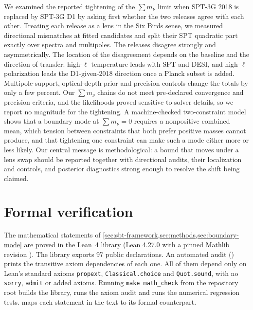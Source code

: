 \documentclass[11pt]{article}
\theoremstyle{remark}
\newcommand{\mnu}{\sum m_\nu}
\numberwithin{equation}{section}
\begin{document}
We examined the reported tightening of the $\mnu$ limit when SPT-3G 2018 is replaced by SPT-3G D1 by asking first whether the two releases agree with each other. Treating each release as a lens in the Six Birds sense, we measured directional mismatches at fitted candidates and split their SPT quadratic part exactly over spectra and multipoles. The releases disagree strongly and asymmetrically. The location of the disagreement depends on the baseline and the direction of transfer: high-$\ell$ temperature leads with SPT and DESI, and high-$\ell$ polarization leads the D1-given-2018 direction once a Planck subset is added. Multipole-support, optical-depth-prior and precision controls change the totals by only a few percent. Our $\mnu$ chains do not meet pre-declared convergence and precision criteria, and the likelihoods proved sensitive to solver details, so we report no magnitude for the tightening. A machine-checked two-constraint model shows that a boundary mode at $\mnu=0$ requires a nonpositive combined mean, which tension between constraints that both prefer positive masses cannot produce, and that tightening one constraint can make such a mode either more or less likely. Our central message is methodological: a bound that moves under a lens swap should be reported together with directional audits, their localization and controls, and posterior diagnostics strong enough to resolve the shift being claimed.
 
\appendix
\section{Formal verification}
\label{app:formal}

The mathematical statements of \cref{sec:sbt-framework,sec:methods,sec:boundary-mode} are proved in the Lean~4 library  (Lean 4.27.0 with a pinned Mathlib revision \cite{lean4,mathlib}). The library exports 97 public declarations. An automated audit () prints the transitive axiom dependencies of each one. All of them depend only on Lean's standard axioms \texttt{propext}, \texttt{Classical.choice} and \texttt{Quot.sound}, with no \texttt{sorry}, \texttt{admit} or added axioms. Running \texttt{make math\_check} from the repository root builds the library, runs the axiom audit and runs the numerical regression tests.  maps each statement in the text to its formal counterpart.
\end{document}
